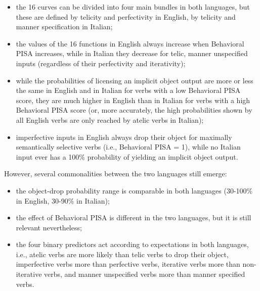 \begin{itemize}
    \item the 16 curves can be divided into four main bundles in both languages, but these are defined by telicity and perfectivity in English, by telicity and manner specification in Italian;
    \item the values of the 16 functions in English always increase when Behavioral PISA increases, while in Italian they decrease for telic, manner unspecified inputs (regardless of their perfectivity and iterativity);
    \item while the probabilities of licensing an implicit object output are more or less the same in English and in Italian for verbs with a low Behavioral PISA score, they are much higher in English than in Italian for verbs with a high Behavioral PISA score (or, more accurately, the high probabilities shown by all English verbs are only reached by atelic verbs in Italian);
    \item imperfective inputs in English always drop their object for maximally semantically selective verbs (i.e., Behavioral PISA = 1), while no Italian input ever has a 100\% probability of yielding an implicit object output.
\end{itemize}

However, several commonalities between the two languages still emerge:
\begin{itemize}
    \item the object-drop probability range is comparable in both languages (30-100\% in English, 30-90\% in Italian);
    \item the effect of Behavioral PISA is different in the two languages, but it is still relevant nevertheless;
    \item the four binary predictors act according to expectations in both languages, i.e., atelic verbs are more likely than telic verbs to drop their object, imperfective verbs more than perfective verbs, iterative verbs more than non-iterative verbs, and manner unspecified verbs more than manner specified verbs.
\end{itemize}

